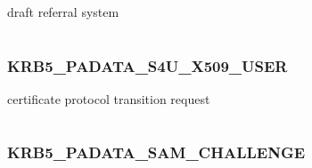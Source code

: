 \documentclass[letterpaper,10pt,english]{sphinxmanual}
\begin{document}
\begin{fulllineitems}
\label{appdev/refs/macros/KRB5_PADATA_REFERRAL:KRB5_PADATA_REFERRAL}
\end{fulllineitems}


draft referral system

\begin{tabulary}{\linewidth}{|L|L|}
\hline

 & 
\\
\hline\end{tabulary}



\subsubsection{KRB5\_PADATA\_S4U\_X509\_USER}
\label{appdev/refs/macros/KRB5_PADATA_S4U_X509_USER:krb5-padata-s4u-x509-user-data}\label{appdev/refs/macros/KRB5_PADATA_S4U_X509_USER::doc}\label{appdev/refs/macros/KRB5_PADATA_S4U_X509_USER:krb5-padata-s4u-x509-user}

\begin{fulllineitems}
\label{appdev/refs/macros/KRB5_PADATA_S4U_X509_USER:KRB5_PADATA_S4U_X509_USER}
\end{fulllineitems}


certificate protocol transition request

\begin{tabulary}{\linewidth}{|L|L|}
\hline

 & 
\\
\hline\end{tabulary}



\subsubsection{KRB5\_PADATA\_SAM\_CHALLENGE}
\label{appdev/refs/macros/KRB5_PADATA_SAM_CHALLENGE:krb5-padata-sam-challenge-data}\label{appdev/refs/macros/KRB5_PADATA_SAM_CHALLENGE::doc}\label{appdev/refs/macros/KRB5_PADATA_SAM_CHALLENGE:krb5-padata-sam-challenge}

\begin{fulllineitems}
\label{appdev/refs/macros/KRB5_PADATA_SAM_CHALLENGE:KRB5_PADATA_SAM_CHALLENGE}
\end{fulllineitems}
\end{document}
